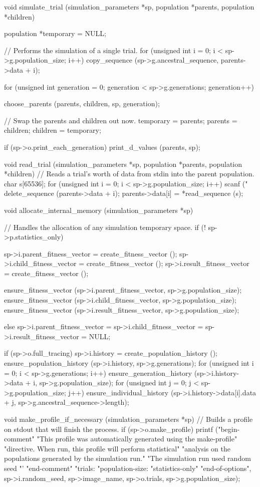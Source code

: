 \documentclass{article}
\begin{document}
\begin{ccode}
void simulate_trial (simulation_parameters *sp, population *parents, population *children) {
  population *temporary = NULL;

  // Performs the simulation of a single trial.
  for (unsigned int i = 0; i < sp->g.population_size; i++)
    copy_sequence (sp->g.ancestral_sequence, parents->data + i);

  for (unsigned int generation = 0; generation < sp->g.generations; generation++) {
    choose_parents (parents, children, sp, generation);

    // Swap the parents and children out now.
    temporary = parents;
    parents = children;
    children = temporary;

    if (sp->o.print_each_generation)
     print_d_values (parents, sp);
  }
}

void read_trial (simulation_parameters *sp, population *parents, population *children) {
  // Reads a trial's worth of data from stdin into the parent population.
  char s[65536];
  for (unsigned int i = 0; i < sp->g.population_size; i++) {
    scanf ("%
    delete_sequence (parents->data + i);
    parents->data[i] = *read_sequence (s);
  }
}

void allocate_internal_memory (simulation_parameters *sp) {
  // Handles the allocation of any simulation temporary space.
  if (! sp->p.statistics_only) {
    sp->i.parent_fitness_vector = create_fitness_vector ();
    sp->i.child_fitness_vector = create_fitness_vector ();
    sp->i.result_fitness_vector = create_fitness_vector ();

    ensure_fitness_vector (sp->i.parent_fitness_vector, sp->g.population_size);
    ensure_fitness_vector (sp->i.child_fitness_vector,  sp->g.population_size);
    ensure_fitness_vector (sp->i.result_fitness_vector, sp->g.population_size);
  } else
    sp->i.parent_fitness_vector = sp->i.child_fitness_vector =
      sp->i.result_fitness_vector = NULL;

  if (sp->o.full_tracing) {
    sp->i.history = create_population_history ();
    ensure_population_history (sp->i.history, sp->g.generations);
    for (unsigned int i = 0; i < sp->g.generations; i++) {
      ensure_generation_history (sp->i.history->data + i, sp->g.population_size);
      for (unsigned int j = 0; j < sp->g.population_size; j++)
       ensure_individual_history (sp->i.history->data[i].data + j, sp->g.ancestral_sequence->length);
    }
  }
}

void make_profile_if_necessary (simulation_parameters *sp) {
  // Builds a profile on stdout that will finish the process.
  if (sp->o.make_profile)
    printf ("begin-comment\n"
	    "This profile was automatically generated using the make-profile\n"
	    "directive. When run, this profile will perform statistical\n"
	    "analysis on the populations generated by the simulation run.\n"
	    "The simulation run used random seed %
	    "'%
	    "end-comment\n\n"
	    "trials: %
	    "population-size: %
	    "statistics-only\n"
	    "end-of-options\n",
	    sp->i.random_seed, sp->image_name, sp->o.trials, sp->g.population_size);
}


\end{ccode}
\end{document}
